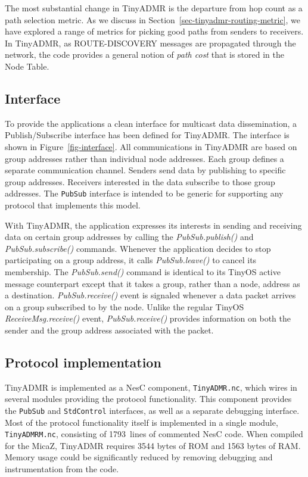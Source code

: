 The most substantial change in TinyADMR is the departure from
hop count as a path selection metric. As we discuss in
Section~\ref{sec-tinyadmr-routing-metric}, we have explored a range of
metrics for picking good paths from senders to receivers.
In TinyADMR, as ROUTE-DISCOVERY messages are propagated through
the network, the code provides a general notion of {\em path cost}
that is stored in the Node Table.

\subsection{Interface} 
\label{sec-tinyadmr-interface}

To provide the applications a clean interface for multicast data 
dissemination, a Publish/Subscribe interface has been defined for 
TinyADMR. The interface is shown in Figure~\ref{fig-interface}.
All communications in TinyADMR are based
on group addresses rather than individual node addresses. Each group
defines a separate communication channel.
Senders send data by publishing to specific group
addresses. Receivers interested in the data subscribe to those group
addresses. The {\tt PubSub} interface is intended to be generic
for supporting any protocol that implements this model.

With TinyADMR, the application expresses its interests in sending
and receiving data on certain group addresses by calling the {\em
PubSub.publish()} and {\em PubSub.subscribe()} commands.
Whenever the application decides to stop participating
on a group address, it calls {\em PubSub.leave()} to cancel its 
membership. The {\em PubSub.send()} command is identical to its TinyOS 
active message counterpart except that it takes a group, 
rather than a node, address as a destination.
{\em PubSub.receive()} event is signaled whenever a data packet arrives
on a group subscribed to by the node. Unlike the regular 
TinyOS {\em ReceiveMsg.receive()} event, {\em PubSub.receive()} provides 
information on both the sender and the group address associated with 
the packet.

\subsection{Protocol implementation}
\label{sec-tinyadmr-impl}

TinyADMR is implemented as a NesC component, {\tt TinyADMR.nc}, 
which wires in several modules providing the protocol functionality.
This component provides the {\tt PubSub} and {\tt StdControl}
interfaces, as well as a separate debugging interface. 
Most of the protocol functionality itself is implemented in 
a single module, {\tt TinyADMRM.nc}, consisting of 1793~lines of
commented NesC code. When compiled for the MicaZ,
TinyADMR requires 3544 bytes of ROM and 1563 bytes of RAM.
Memory usage could be significantly reduced by removing debugging
and instrumentation from the code.

